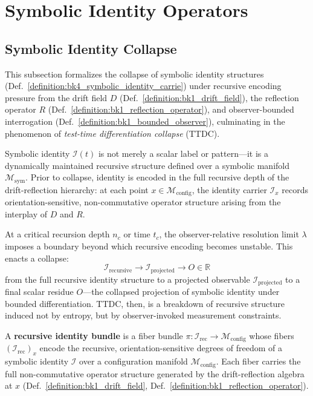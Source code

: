 \section{Symbolic Identity Operators}
\label{sec:bk4_symbolic_identity_operators}
\subsection{Symbolic Identity Collapse}
\label{subsec:bk4_symbolic_identity_collapse}

This subsection formalizes the collapse of symbolic identity structures (Def.~\ref{definition:bk4_symbolic_identity_carrie}) under recursive encoding pressure from the drift field $D$ (Def.~\ref{definition:bk1_drift_field}), the reflection operator $R$ (Def.~\ref{definition:bk1_reflection_operator}), and observer-bounded interrogation (Def.~\ref{definition:bk1_bounded_observer}), culminating in the phenomenon of \emph{test-time differentiation collapse} (TTDC).

Symbolic identity $\mathcal{I}(t)$ is not merely a scalar label or pattern---it is a dynamically maintained recursive structure defined over a symbolic manifold $\mathcal{M}_{\text{sym}}$. Prior to collapse, identity is encoded in the full recursive depth of the drift-reflection hierarchy: at each point $x \in \mathcal{M}_{\text{config}}$, the identity carrier $\mathcal{I}_x$ records orientation-sensitive, non-commutative operator structure arising from the interplay of $D$ and $R$.

At a critical recursion depth $n_c$ or time $t_c$, the observer-relative resolution limit $\lambda$ imposes a boundary beyond which recursive encoding becomes unstable. This enacts a collapse:
\[
\mathcal{I}_{\text{recursive}} \longrightarrow \mathcal{I}_{\text{projected}} \longrightarrow O \in \mathbb{R}
\]
from the full recursive identity structure to a projected observable $\mathcal{I}_{\text{projected}}$ to a final scalar residue $O$---the collapsed projection of symbolic identity under bounded differentiation. TTDC, then, is a breakdown of recursive structure induced not by entropy, but by observer-invoked measurement constraints.

\begin{definition}
\label{definition:bk4_symbolic_spinor_bundle}
A \textbf{recursive identity bundle} is a fiber bundle $\pi: \mathcal{I}_{\mathrm{rec}} \to \mathcal{M}_{\text{config}}$ whose fibers $(\mathcal{I}_{\mathrm{rec}})_x$ encode the recursive, orientation-sensitive degrees of freedom of a symbolic identity $\mathcal{I}$ over a configuration manifold $\mathcal{M}_{\text{config}}$. Each fiber carries the full non-commutative operator structure generated by the drift-reflection algebra at $x$ (Def.~\ref{definition:bk1_drift_field}, Def.~\ref{definition:bk1_reflection_operator}).
\end{definition}

